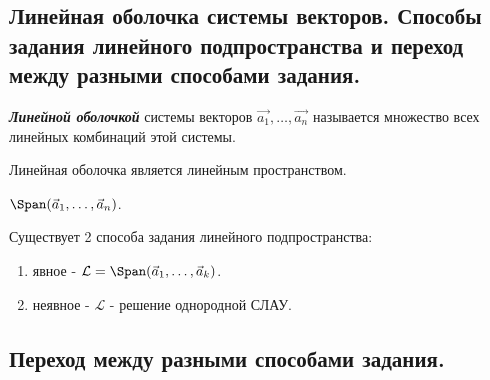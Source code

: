 \subsection{
    Линейная оболочка системы векторов. Способы задания линейного подпространства и переход между разными способами задания.
}

\begin{definition}
    \textbf{\textit{Линейной оболочкой}} системы векторов $\vec{a_1}, \ldots, \vec{a_n}$ называется множество всех линейных комбинаций этой системы.
\end{definition}

\begin{theorem}
    Линейная оболочка является линейным пространством.
\end{theorem}

\begin{designation}
    $\Span(\vec{a}_1, \ldots, \vec{a}_n)$.
\end{designation}

Существует 2 способа задания линейного подпространства:

\begin{enumerate}
    \item явное - $\mathcal{L} = \Span(\vec{a}_1, \ldots, \vec{a}_k)$.
    \item неявное - $\mathcal{L}$ - решение однородной СЛАУ.
\end{enumerate}

\subsection*{Переход между разными способами задания.
}

